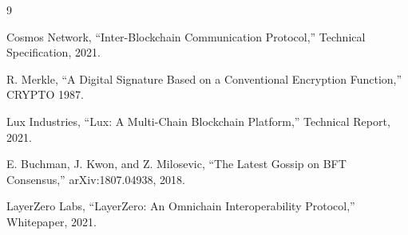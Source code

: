 \documentclass[11pt,twocolumn]{article}
\begin{document}

\begin{thebibliography}{9}

Cosmos Network, ``Inter-Blockchain Communication Protocol,'' Technical Specification, 2021.

R. Merkle, ``A Digital Signature Based on a Conventional Encryption Function,'' CRYPTO 1987.

Lux Industries, ``Lux: A Multi-Chain Blockchain Platform,'' Technical Report, 2021.

E. Buchman, J. Kwon, and Z. Milosevic, ``The Latest Gossip on BFT Consensus,'' arXiv:1807.04938, 2018.

LayerZero Labs, ``LayerZero: An Omnichain Interoperability Protocol,'' Whitepaper, 2021.

\end{thebibliography}
\end{document}

